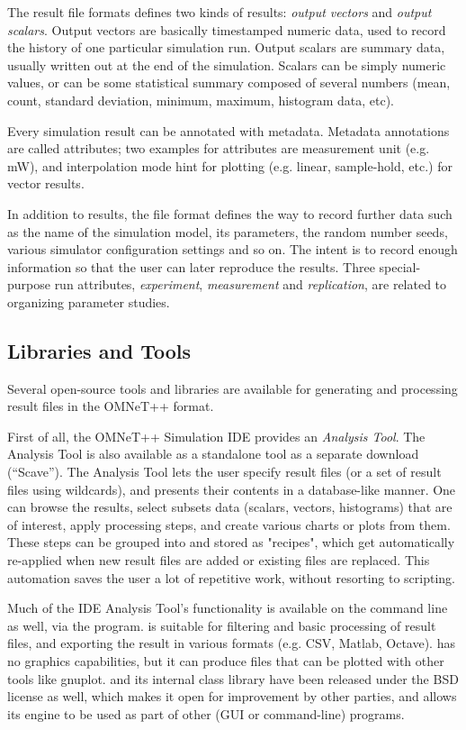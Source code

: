The result file formats defines two kinds of results: \textit{output
vectors} and \textit{output scalars}. Output vectors are basically
timestamped numeric data, used to record the history of one particular
simulation run. Output scalars are summary data, usually written out at the
end of the simulation. Scalars can be simply numeric values, or can be some
statistical summary composed of several numbers (mean, count, standard deviation,
minimum, maximum, histogram data, etc).

Every simulation result can be annotated with metadata. Metadata
annotations are called attributes; two examples for attributes are
measurement unit (e.g. mW), and interpolation mode hint for plotting
(e.g. linear, sample-hold, etc.) for vector results.

In addition to results, the file format defines the way to record
further data such as the name of the simulation model, its parameters, the
random number seeds, various simulator configuration settings and so on.
The intent is to record enough information so that the user can later
reproduce the results. Three special-purpose run attributes,
\textit{experiment}, \textit{measurement} and \textit{replication},
are related to organizing parameter studies.


\subsection{Libraries and Tools}

Several open-source tools and libraries are available for generating and
processing result files in the OMNeT++ format.

First of all, the OMNeT++ Simulation IDE provides an \textit{Analysis
Tool}. The Analysis Tool is also available as a standalone tool as a
separate download (``Scave''). The Analysis Tool lets the user specify
result files (or a set of result files using wildcards), and presents their
contents in a database-like manner. One can browse the results, select
subsets data (scalars, vectors, histograms) that are of interest, apply
processing steps, and create various charts or plots from them. These steps
can be grouped into and stored as "recipes", which get automatically
re-applied when new result files are added or existing files are replaced.
This automation saves the user a lot of repetitive work, without resorting
to scripting.

Much of the IDE Analysis Tool's functionality is available on the command
line as well, via the  program.  is suitable
for filtering and basic processing of result files, and exporting the
result in various formats (e.g. CSV, Matlab, Octave).  has
no graphics capabilities, but it can produce files that can be plotted with
other tools like gnuplot.  and its internal class library
have been released under the BSD license as well, which makes it open for
improvement by other parties, and allows its engine to be used as part of
other (GUI or command-line) programs.

